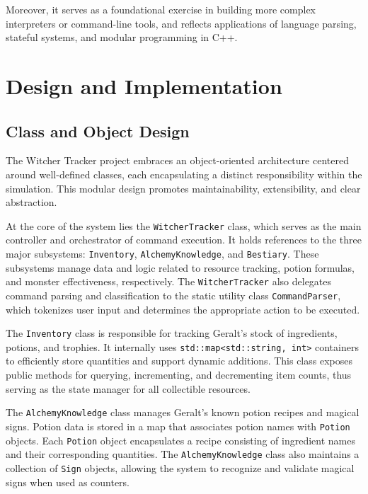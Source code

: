 \documentclass{article}
\begin{document}
Moreover, it serves as a foundational exercise in building more complex interpreters or command-line tools, and reflects applications of language parsing, stateful systems, and modular programming in C++.

\newpage

\section{Design and Implementation}
\subsection*{Class and Object Design}

The Witcher Tracker project embraces an object-oriented architecture centered around well-defined classes, each encapsulating a distinct responsibility within the simulation. This modular design promotes maintainability, extensibility, and clear abstraction.

At the core of the system lies the \texttt{WitcherTracker} class, which serves as the main controller and orchestrator of command execution. It holds references to the three major subsystems: \texttt{Inventory}, \texttt{AlchemyKnowledge}, and \texttt{Bestiary}. These subsystems manage data and logic related to resource tracking, potion formulas, and monster effectiveness, respectively. The \texttt{WitcherTracker} also delegates command parsing and classification to the static utility class \texttt{CommandParser}, which tokenizes user input and determines the appropriate action to be executed.

The \texttt{Inventory} class is responsible for tracking Geralt’s stock of ingredients, potions, and trophies. It internally uses \texttt{std::map<std::string, int>} containers to efficiently store quantities and support dynamic additions. This class exposes public methods for querying, incrementing, and decrementing item counts, thus serving as the state manager for all collectible resources.

The \texttt{AlchemyKnowledge} class manages Geralt's known potion recipes and magical signs. Potion data is stored in a map that associates potion names with \texttt{Potion} objects. Each \texttt{Potion} object encapsulates a recipe consisting of ingredient names and their corresponding quantities. The \texttt{AlchemyKnowledge} class also maintains a collection of \texttt{Sign} objects, allowing the system to recognize and validate magical signs when used as counters.
\end{document}
